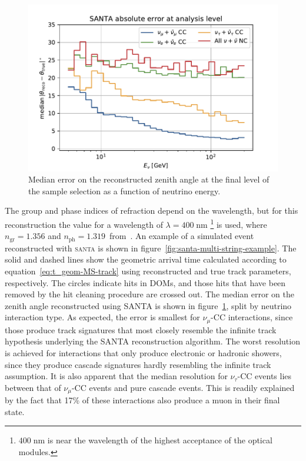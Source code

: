 \begin{figure}
    \centering
    \includegraphics[width=0.8\linewidth]{figures/icecube/reconstruction/santa/santa_absolute_error_final.pdf}
    \caption{Median error on the reconstructed zenith angle at the final level of the sample selection as a function of neutrino energy.}
    \label{fig:santa-resolution}
\end{figure}

The group and phase indices of refraction depend on the wavelength, but for this reconstruction the value for a wavelength of $\lambda=400\;\mathrm{nm}$
\footnote{$400\;\mathrm{nm}$ is near the wavelength of the highest acceptance of the optical modules.\cite{icecube_detector_17}} is used, where $n_{\mathrm{gr}}=1.356$ and $n_{\mathrm{ph}}=1.319$~from~. An example of a simulated event reconstructed with \textsc{santa} is shown in figure~\ref{fig:santa-multi-string-example}. The solid and dashed lines show the geometric arrival time calculated according to equation~\ref{eq:t_geom-MS-track} using reconstructed and true track parameters, respectively. The circles indicate hits in DOMs, and those hits that have been removed by the hit cleaning procedure are crossed out. The median error on the zenith angle reconstructed using \textsc{SANTA} is shown in figure~\ref{fig:santa-resolution}, split by neutrino interaction type. As expected, the error is smallest for $\nu_\mu$-CC interactions, since those produce track signatures that most closely resemble the infinite track hypothesis underlying the \textsc{SANTA} reconstruction algorithm. The worst resolution is achieved for interactions that only produce electronic or hadronic showers, since they produce cascade signatures hardly resembling the infinite track assumption. It is also apparent that the median resolution for $\nu_\tau$-CC events lies between that of $\nu_\mu$-CC events and pure cascade events. This is readily explained by the fact that 17\% of these interactions also produce a muon in their final state.

